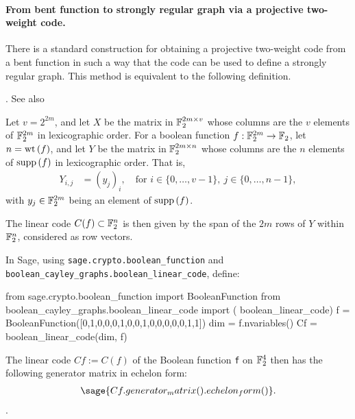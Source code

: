 \paragraph*{From bent function to strongly regular graph via a projective two-weight code.}
There is a standard construction for obtaining a projective two-weight code from a bent function in such a way that
the code can be used to define a strongly regular graph.
This method is equivalent to the following definition.
\begin{Definition}
\label{def-boolean-linear-code}
\cite{Din2015}.
See also \cite[Definition 2A]{CalK1986}

Let $v=2^{2m}$, and let $X$ be the matrix in  $\mathbb{F}_2^{2m \times v}$
whose columns are the $v$ elements of $\mathbb{F}_2^{2m}$ in lexicographic order.
For a boolean function $f : \mathbb{F}_2^{2m} \rightarrow \mathbb{F}_2$,
let $n=\operatorname{wt}\left(f\right)$, and let $Y$ be the matrix in $\mathbb{F}_2^{2m \times n}$
whose columns are the $n$ elements of $\operatorname{supp}\left(f\right)$ in lexicographic order.
That is,
\begin{align*}
Y_{i,j} &= (y_j)_i, \quad \text{for~} i \in \{0,\ldots,v-1\},\ j \in \{0,\ldots,n-1\},
\end{align*}
with $y_j \in \mathbb{F}_2^{2m}$ being an element of $\operatorname{supp}\left(f\right)$.

The linear code $C(f) \subset \mathbb{F}_2^n$ is then given by the span of the $2 m$ rows of $Y$ within $\mathbb{F}_2^n$,
considered as row vectors.
\end{Definition}
%

\begin{example}
In Sage, using \verb!sage.crypto.boolean_function! and
\newline
\verb!boolean_cayley_graphs.boolean_linear_code!, define:
\begin{sageblock}
from sage.crypto.boolean_function import BooleanFunction
from boolean_cayley_graphs.boolean_linear_code import (
     boolean_linear_code)
f = BooleanFunction([0,1,0,0,0,1,0,0,1,0,0,0,0,0,1,1])
dim = f.nvariables()
Cf = boolean_linear_code(dim, f)
\end{sageblock}
The linear code $Cf := C(f)$ of the Boolean function \verb!f! on $\mathbb{F}_2^4$ then has the following
generator matrix in echelon form:
\begin{align*}
\sage{Cf.generator_matrix().echelon_form()}.
\end{align*}
\cite{Leo16GitHub} \cite[Boolean Functions]{SageMath8418}.
\end{example}

